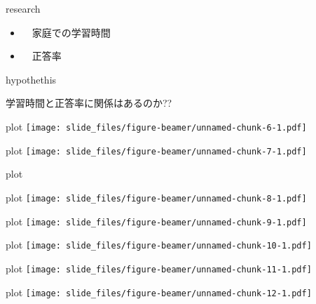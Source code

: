\documentclass[
  ignorenonframetext,
]{beamer}
\providecommand{\tightlist}{%
  \setlength{\itemsep}{0pt}\setlength{\parskip}{0pt}}
\begin{document}
\begin{frame}{research}
\protect\hypertarget{research-1}{}
\LARGE

\begin{itemize}[<+->]
\tightlist
\item
  　\textbullet 家庭での学習時間
\item
  　\textbullet 正答率
\end{itemize}
\end{frame}

\begin{frame}{hypothethis}
\protect\hypertarget{hypothethis}{}
\LARGE

学習時間と正答率に関係はあるのか??
\end{frame}

\begin{frame}{plot}
\protect\hypertarget{plot}{}
\texttt{[image: slide\_files/figure-beamer/unnamed-chunk-6-1.pdf]}
\end{frame}

\begin{frame}{plot}
\protect\hypertarget{plot-1}{}
\texttt{[image: slide\_files/figure-beamer/unnamed-chunk-7-1.pdf]}
\end{frame}

\begin{frame}{plot}
\protect\hypertarget{plot-2}{}
\end{frame}

\begin{frame}{plot}
\protect\hypertarget{plot-3}{}
\texttt{[image: slide\_files/figure-beamer/unnamed-chunk-8-1.pdf]}
\end{frame}

\begin{frame}{plot}
\protect\hypertarget{plot-4}{}
\texttt{[image: slide\_files/figure-beamer/unnamed-chunk-9-1.pdf]}
\end{frame}

\begin{frame}{plot}
\protect\hypertarget{plot-5}{}
\texttt{[image: slide\_files/figure-beamer/unnamed-chunk-10-1.pdf]}
\end{frame}

\begin{frame}{plot}
\protect\hypertarget{plot-6}{}
\texttt{[image: slide\_files/figure-beamer/unnamed-chunk-11-1.pdf]}
\end{frame}

\begin{frame}{plot}
\protect\hypertarget{plot-7}{}
\texttt{[image: slide\_files/figure-beamer/unnamed-chunk-12-1.pdf]}
\end{frame}
\end{document}
